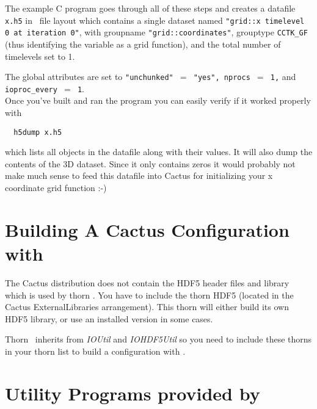 \documentclass{article}
\begin{document}
The example C program goes through all of these steps and creates a datafile
{\tt x.h5} in \ThisThorn\ file layout which contains a single dataset named
{\tt "grid::x timelevel 0 at iteration 0"}, with groupname
{\tt "grid::coordinates"}, grouptype {\tt CCTK\_GF} (thus identifying the
variable as a grid function), and the total number of timelevels set to 1.

The global attributes are set to
{\tt "unchunked" $=$ "yes", nprocs $=$ 1,} and {\tt ioproc\_every $=$ 1}.\\

Once you've built and ran the program you can easily verify if it worked
properly with
\begin{verbatim}
  h5dump x.h5
\end{verbatim}
which lists all objects in the datafile along with their values.
It will also dump the contents of the 3D dataset. Since it only contains zeros
it would probably not make much sense to feed this datafile into Cactus for
initializing your x coordinate grid function :-)
%
%
\section{Building A Cactus Configuration with \ThisThorn}
%
The Cactus distribution does not contain the HDF5 header files and library which
is used by thorn \ThisThorn. You have to include the thorn HDF5 (located
in the Cactus ExternalLibraries arrangement). This thorn will either build
its own HDF5 library, or use an installed version in some cases.

Thorn \ThisThorn\ inherits from {\it IOUtil} and {\it IOHDF5Util}
so you need to include these thorns in your thorn list to build a configuration
with \ThisThorn.
%
%
\section{Utility Programs provided by \ThisThorn}
%
\label{IOHDF5_utility_programs}
\end{document}
